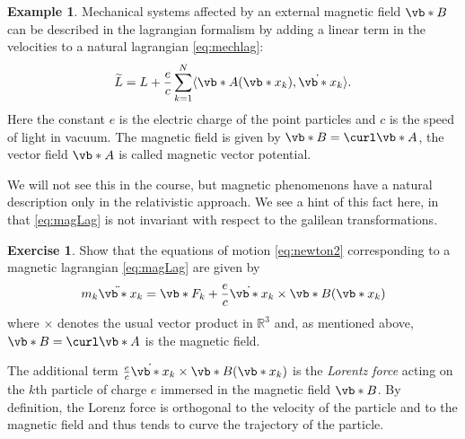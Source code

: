 \documentclass[english,fontsize=11pt,paper=b5]{scrbook}
\numberwithin{equation}{chapter}
\theoremstyle{definition}
\newtheorem{example}{Example}[chapter]
\newtheorem{exercise}{Exercise}[chapter]
\newcommand{\emphidx}[1]{\index{#1}\emph{#1}}
\begin{document}
    \begin{example}\label{exa:magnetic}
      Mechanical systems affected by an external magnetic field $\vb* B$ can be described in the lagrangian formalism by adding a linear term in the velocities to a natural lagrangian \eqref{eq:mechlag}:
      \begin{equation}\label{eq:magLag}
        \widetilde L = L + \frac ec \sum_{k=1}^N \langle\vb* A(\vb*{x}_k), \dot{\vb*{x}}_k\rangle.
      \end{equation}
      Here the constant $e$ is the electric charge of the point particles and $c$ is the speed of light in vacuum.
      The magnetic field is given by $\vb* B = \curl \vb* A$, the vector field $\vb* A$ is called magnetic vector potential.

      We will not see this in the course, but magnetic phenomenons have a natural description only in the relativistic approach. We see a hint of this fact here, in that \eqref{eq:magLag} is not invariant with respect to the galilean transformations.

      \begin{exercise}\label{exe:magnetic}
        Show that the equations of motion \eqref{eq:newton2} corresponding to a magnetic lagrangian \eqref{eq:magLag} are given by
        \begin{equation}
          m_k \ddot{\vb*{x}}_k = \vb*{F}_k + \frac ec \dot{\vb*{x}}_k \times \vb* B(\vb*{x}_k)
        \end{equation}
        where $\times$ denotes the usual vector product in $\mathbb{R}^3$ and, as mentioned above, $\vb* B = \curl \vb* A$ is the magnetic field.

        The additional term $\frac ec \dot{\vb*{x}}_k\times \vb* B(\vb*{x}_k)$ is the \emphidx{Lorentz force} acting on the $k$th particle of charge $e$ immersed in the magnetic field $\vb* B$. By definition, the Lorenz force is orthogonal to the velocity of the particle and to the magnetic field and thus tends to curve the trajectory of the particle.



\end{exercise}
\end{example}
\end{document}
